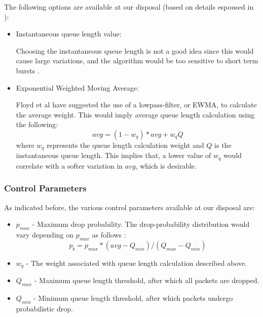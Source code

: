 \documentclass[conference, 10pt]{IEEEtran}
\begin{document}
The following options are available at our disposal (based on details espoused in \cite{floyd1993random}):
\begin{itemize}
    \item Instantaneous queue length value:
    
    Choosing the instantaneous queue length is not a good idea since this would cause large variations, and the algorithm would be too sensitive to short term bursts \cite{floyd1993random}.  
    \item Exponential Weighted Moving Average:
    
    Floyd et al \cite{floyd1993random} have suggested the use of a lowpass-filter, or EWMA, to calculate the average weight. This would imply average queue length calculation using the following:
    $$avg = (1 - w_q)*avg+w_qQ$$
    where $w_q$ represents the queue length calculation weight and $Q$ is the instantaneous queue length. This implies that, a lower value of $w_q$ would correlate with a softer variation in $avg$, which is desirable. 
    
\end{itemize}
\subsubsection{Control Parameters}
\label{sec:back:ngacpm:rel}

As indicated before, the various control parameters available at our disposal are:

\begin{itemize}
    \item $p_{max}$ - Maximum drop probability. The drop-probability distribution would vary depending on $p_{max}$ as follows \cite{floyd1993random}:
    $$p_b = p_{max} * (avg - Q_{min})/(Q_{max} - Q_{min})$$
    \item $w_q$ - The weight associated with queue length calculation described above.
    \item $Q_{max}$ - Maximum queue length threshold, after which all packets are dropped.
    \item $Q_{min}$ - Minimum queue length threshold, after which packets undergo probabilistic drop. 
\end{itemize}
\end{document}
